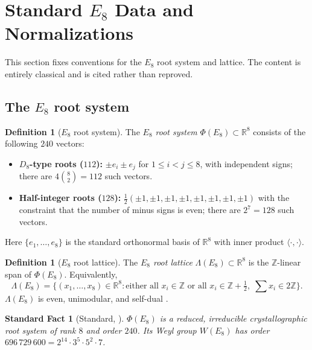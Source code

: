 \documentclass[11pt, a4paper]{amsart}
\newtheorem{fact}[theorem]{Standard Fact}
\theoremstyle{definition}
\newtheorem{definition}[theorem]{Definition}
\newcommand{\R}{\mathbb{R}}
\newcommand{\Z}{\mathbb{Z}}
\begin{document}
\section{Standard $E_8$ Data and Normalizations}
\label{sec:E8}

This section fixes conventions for the $E_8$ root system and
lattice. The content is entirely classical and is cited rather than
reproved.

\subsection{The $E_8$ root system}

\begin{definition}[$E_8$ root system]
\label{def:E8}
The \emph{$E_8$ root system} $\Phi(E_8) \subset \R^8$ consists of
the following $240$ vectors:
\begin{itemize}
\item \textbf{$D_8$-type roots ($112$):}
  $\pm e_i \pm e_j$ for $1 \leq i < j \leq 8$, with independent
  signs; there are $4 \binom{8}{2} = 112$ such vectors.
\item \textbf{Half-integer roots ($128$):}
  $\frac{1}{2}(\pm 1, \pm 1, \pm 1, \pm 1, \pm 1, \pm 1, \pm 1, \pm 1)$
  with the constraint that the number of minus signs is even;
  there are $2^7 = 128$ such vectors.
\end{itemize}
Here $\{e_1, \ldots, e_8\}$ is the standard orthonormal basis of
$\R^8$ with inner product $\langle \cdot, \cdot \rangle$.
\end{definition}

\begin{definition}[$E_8$ root lattice]
\label{def:lambda-E8}
The \emph{$E_8$ root lattice} $\Lambda(E_8) \subset \R^8$ is the
$\Z$-linear span of $\Phi(E_8)$. Equivalently,
\[
  \Lambda(E_8) = \big\{ (x_1, \ldots, x_8) \in \R^8 :
    \text{either all } x_i \in \Z \text{ or all } x_i \in \Z + \tfrac{1}{2},
    \; \sum x_i \in 2\Z \big\}.
\]
$\Lambda(E_8)$ is even, unimodular, and self-dual
\cite[\S III.4]{Serre}.
\end{definition}

\begin{fact}[Standard, \cite{Humphreys, Bourbaki}]
\label{fact:E8-irred}
$\Phi(E_8)$ is a reduced, irreducible crystallographic root system
of rank $8$ and order $240$. Its Weyl group $W(E_8)$ has order
$696\,729\,600 = 2^{14} \cdot 3^5 \cdot 5^2 \cdot 7$.
\end{fact}
\end{document}
